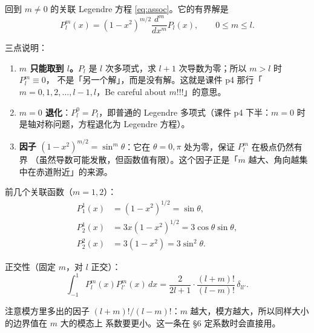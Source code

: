 

回到 $m\ne0$ 的关联 Legendre 方程 \eqref{eq:assoc}。它的有界解是
\begin{equation}
P_l^m(x)=(1-x^2)^{m/2}\frac{d^m}{dx^m}P_l(x),\qquad 0\le m\le l .
\label{eq:assocP}
\end{equation}

三点说明：

\begin{enumerate}[label=\textbf{(\arabic*)}]
  \item \textbf{$m$ 只能取到 $l$。}$P_l$ 是 $l$ 次多项式，求 $l+1$ 次导数为零；所以 $m>l$ 时 $P_l^m\equiv0$，
        不是「另一个解」，而是没有解。这就是课件 p4 那行「$m=0,1,2,\dots,l-1,l$，Be careful about $m$!!!」的意思。
  \item \textbf{$m=0$ 退化}：$P_l^0=P_l$，即普通的 Legendre 多项式（课件 p4 下半：$m=0$ 时是轴对称问题，方程退化为 Legendre 方程）。
  \item \textbf{因子 $(1-x^2)^{m/2}=\sin^m\theta$}：它在 $\theta=0,\pi$ 处为零，保证 $P_l^m$ 在极点仍然有界
        （虽然导数可能发散，但函数值有限）。这个因子正是「$m$ 越大、角向越集中在赤道附近」的来源。
\end{enumerate}

前几个关联函数（$m=1,2$）：
\begin{align}
P_1^1(x)&=(1-x^2)^{1/2}=\sin\theta, \label{eq:P11}\\
P_2^1(x)&=3x(1-x^2)^{1/2}=3\cos\theta\sin\theta, \label{eq:P21}\\
P_2^2(x)&=3(1-x^2)=3\sin^2\theta . \label{eq:P22}
\end{align}

正交性（固定 $m$，对 $l$ 正交）：
\begin{equation}
\int_{-1}^{1}P_l^m(x)P_{l'}^m(x)\,dx=\frac{2}{2l+1}\cdot\frac{(l+m)!}{(l-m)!}\,\delta_{ll'} .
\label{eq:orthPm}
\end{equation}

注意模方里多出的因子 $(l+m)!/(l-m)!$：$m$ 越大，模方越大，所以同样大小的边界值在 $m$ 大的模态上
系数要更小。这一条在 \S6 定系数时会直接用。


